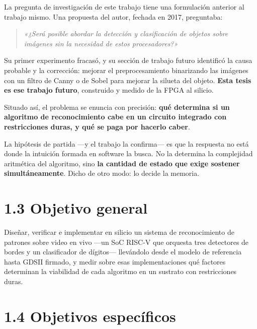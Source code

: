 La pregunta de investigación de este trabajo tiene una formulación
anterior al trabajo mismo. Una propuesta del autor, fechada en 2017,
preguntaba:

\begin{quote}
\emph{«¿Será posible abordar la detección y clasificación de objetos
sobre imágenes sin la necesidad de estos procesadores?»}
\end{quote}

Su primer experimento fracasó, y su sección de trabajo futuro identificó
la causa probable y la corrección: mejorar el preprocesamiento
binarizando las imágenes con un filtro de Canny o de Sobel para mejorar
la silueta del objeto. \textbf{Esta tesis es ese trabajo futuro},
construido y medido de la FPGA al silicio.

Situado así, el problema se enuncia con precisión: \textbf{qué determina
si un algoritmo de reconocimiento cabe en un circuito integrado con
restricciones duras, y qué se paga por hacerlo caber}.

La hipótesis de partida ---y el trabajo la confirma--- es que la
respuesta no está donde la intuición formada en software la busca. No la
determina la complejidad aritmética del algoritmo, sino \textbf{la
cantidad de estado que exige sostener simultáneamente}. Dicho de otro
modo: lo decide la memoria.

\section{1.3 Objetivo general}\label{objetivo-general}

Diseñar, verificar e implementar en silicio un sistema de reconocimiento
de patrones sobre video en vivo ---un SoC RISC-V que orquesta tres
detectores de bordes y un clasificador de dígitos--- llevándolo desde el
modelo de referencia hasta GDSII firmado, y medir sobre esas
implementaciones qué factores determinan la viabilidad de cada algoritmo
en un sustrato con restricciones duras.

\section{1.4 Objetivos específicos}\label{objetivos-especuxedficos}

